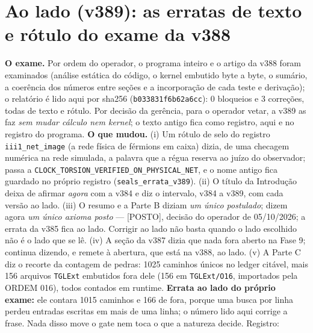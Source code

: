 \documentclass[11pt]{article}
\theoremstyle{definition}\newtheorem{deriv}{Derivação}
\begin{document}
\section*{Ao lado (v389): as erratas de texto e rótulo do exame da v388}


\textbf{O exame.} Por ordem do operador, o programa inteiro e o artigo da v388 foram examinados (análise estática do código, o kernel embutido byte a byte, o sumário, a coerência dos números entre seções e a incorporação de cada teste e derivação); o relatório é lido aqui por sha256 (\texttt{b033831f6b62a6cc}): 0 bloqueios e 3 correções, todas de texto e rótulo. Por decisão da gerência, para o operador vetar, a v389 as faz \emph{sem mudar cálculo nem kernel}; o texto antigo fica como registro, aqui e no registro do programa. \textbf{O que mudou.} (i) Um rótulo de selo do registro \texttt{iii1\_net\_image} (a rede física de férmions em caixa) dizia, de uma checagem numérica na rede simulada, a palavra que a régua reserva ao juízo do observador; passa a \texttt{CLOCK\_\allowbreak{}TORSION\_\allowbreak{}VERIFIED\_\allowbreak{}ON\_\allowbreak{}PHYSICAL\_\allowbreak{}NET}, e o nome antigo fica guardado no próprio registro (\texttt{seals\_errata\_v389}). (ii) O título da Introdução deixa de afirmar \emph{agora} com a v384 e diz o intervalo, v384 a v389, com cada versão ao lado. (iii) O resumo e a Parte B diziam \emph{um único postulado}; dizem agora \emph{um único axioma posto} --- \textsf{[POSTO]}, decisão do operador de 05/10/2026; a errata da v385 fica ao lado. Corrigir ao lado não basta quando o lado escolhido não é o lado que se lê. (iv) A seção da v387 dizia que nada fora aberto na Fase 9; continua dizendo, e remete à abertura, que está na v388, ao lado. (v) A Parte C diz o recorte da contagem de pedras: 1025 caminhos únicos no ledger citável, mais 156 arquivos \texttt{TGLExt} embutidos fora dele (156 em \texttt{TGLExt/O16}, importados pela ORDEM 016), todos contados em runtime. \textbf{Errata ao lado do próprio exame:} ele contara 1015 caminhos e 166 de fora, porque uma busca por linha perdeu entradas escritas em mais de uma linha; o número lido aqui corrige a frase. Nada disso move o gate nem toca o que a natureza decide. Registro: 
\end{document}
